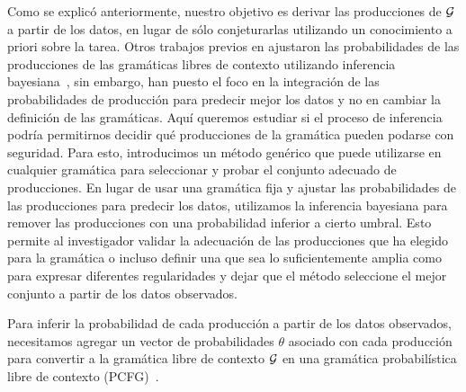 Como se explicó anteriormente, nuestro objetivo es derivar las producciones de $\gram$ a partir de los datos, en lugar de sólo conjeturarlas utilizando un conocimiento a priori sobre la tarea. Otros trabajos previos en \lot ajustaron las probabilidades de las producciones de las gramáticas libres de contexto utilizando inferencia bayesiana~\cite{piantadosi2016logical}, sin embargo, han puesto el foco en la integración de las probabilidades de producción para predecir mejor los datos y no en cambiar la definición de las gramáticas. Aquí queremos estudiar si el proceso de inferencia podría permitirnos decidir qué producciones de la gramática pueden podarse con seguridad. Para esto, introducimos un método genérico que puede utilizarse en cualquier gramática para seleccionar y probar el conjunto adecuado de producciones. En lugar de usar una gramática fija y ajustar las probabilidades de las producciones para predecir los datos, utilizamos la inferencia bayesiana para remover las producciones con una probabilidad inferior a cierto umbral. Esto permite al investigador validar la adecuación de las producciones que ha elegido para la gramática o incluso definir una que sea lo suficientemente amplia como para expresar diferentes regularidades y dejar que el método seleccione el mejor conjunto a partir de los datos observados.   



Para inferir la probabilidad de cada producción a partir de los datos observados, necesitamos agregar un vector de probabilidades $\theta$ asociado con cada producción para convertir a la gramática libre de contexto $\gram$ en una gramática probabilística libre de contexto (PCFG)~\cite{manning1999foundations}.


